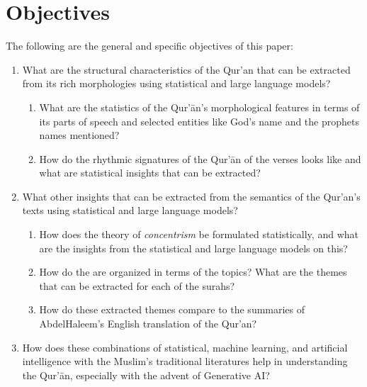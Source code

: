 \section{Objectives}\label{sec:objectives}
The following are the general and specific objectives of this paper:
\begin{enumerate}
    \item What are the structural characteristics of the Qur'an that can be extracted from its rich morphologies using statistical and large language models?
    \begin{enumerate}
        \item What are the statistics of the Qur'\=an's morphological features in terms of its parts of speech and selected entities like God's name and the prophets names mentioned?
        
        \item How do the rhythmic signatures of the Qur'\=an of the verses looks like and what are statistical insights that can be extracted?
    \end{enumerate}
    
    \item What other insights that can be extracted from the semantics of the Qur'an's texts using statistical and large language models?
    \begin{enumerate}
        \item How does the theory of \textit{concentrism} be formulated statistically, and what are the insights from the statistical and large language models on this? 
        
        \item How do the   are organized in terms of the topics? What are the themes that can be extracted for each of the surahs?
        
        \item How do these extracted themes compare to the summaries of Abdel\linebreak Haleem's English translation of the Qur'an?
    \end{enumerate}
    
    \item How does these combinations of statistical, machine learning, and artificial intelligence with the Muslim's traditional literatures help in understanding the Qur'\=an, especially with the advent of Generative AI?
\end{enumerate}

